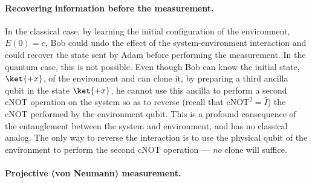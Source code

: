 \paragraph{Recovering information before the measurement. }

In the classical case, by learning the initial configuration of the
environment, $E\left(0\right)=e$, Bob could undo the effect of the
system-environment interaction and could recover the state sent by
Adam before performing the measurement. In the quantum case, this
is not possible. Even though Bob can know the initial state, $\ket{+x}$,
of the environment and can clone it, by preparing a third ancilla
qubit in the state $\ket{+x}$, he cannot use this ancilla to perform
a second cNOT operation on the system so as to reverse (recall that
$\mathrm{cNOT}^{2}=\hat{I}$) the cNOT performed by the environment
qubit. This is a profound consequence of the entanglement between
the system and environment, and has no classical analog. The only
way to reverse the interaction is to use the physical qubit of the
environment to perform the second cNOT operation — \emph{no} clone
will suffice. 

\paragraph{Projective (von Neumann) measurement.\label{par:Projective-(von-Neumann)}}

